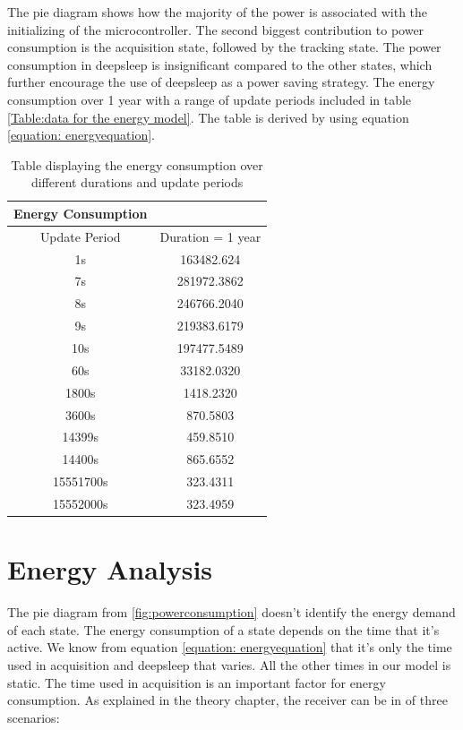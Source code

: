 The pie diagram shows how the majority of the power is associated with the initializing of the microcontroller. The second biggest contribution to power consumption is the acquisition state, followed by the tracking state. The power consumption in deepsleep is insignificant compared to the other states, which further encourage the use of deepsleep as a power saving strategy. The energy consumption over 1 year with a range of update periods included in table \ref{Table:data for the energy model}. The table is derived by using equation \ref{equation: energyequation}.

\begin{table}[h!]
\begin{center}
 \begin{tabular}{||c c||} 
 \hline
 Energy Consumption & \\
 \hline
  Update Period & Duration = 1 year \\[0.5ex] 
 \hline\hline
  1s & 163482.624 \\ 
 \hline
  7s & 281972.3862 \\
  \hline
  8s & 246766.2040 \\
  \hline
  9s & 219383.6179 \\
  \hline
  10s & 197477.5489 \\
 \hline
  60s & 33182.0320 \\
 \hline
  1800s & 1418.2320 \\
  \hline
  3600s & 870.5803 \\
  \hline
  14399s & 459.8510 \\
  \hline
  14400s & 865.6552 \\
  \hline
  15551700s & 323.4311 \\
  \hline
  15552000s & 323.4959 \\[1ex]
 \hline
\end{tabular}
\end{center}
\caption{Table displaying the energy consumption over different durations and update periods}
\label{Table:energy}
\end{table}


\section{Energy Analysis}

The pie diagram from \ref{fig:powerconsumption} doesn't identify the energy demand of each state. The energy consumption of a state depends on the time that it's active. We know from equation \ref{equation: energyequation} that it's only the time used in acquisition and deepsleep that varies. All the other times in our model is static. The time used in acquisition is an important factor for energy consumption. As explained in the theory chapter, the receiver can be in of three scenarios: 

